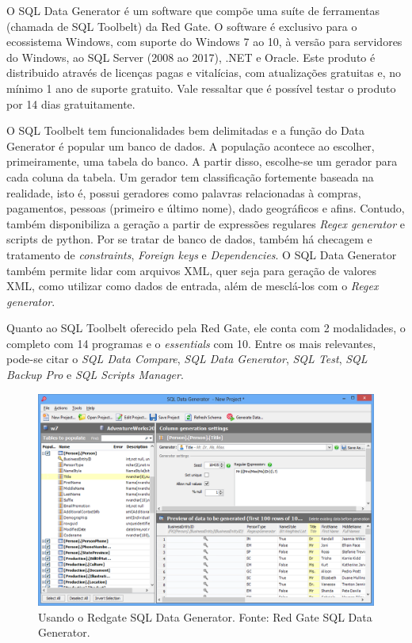 \documentclass[
	12pt,				%
	openright,			%
	twoside,			%
	a4paper,			%
	english,			%
	brazil				%
	]{abntex2}
\begin{document}
		O SQL Data Generator \cite{RedgateSQLDataGenerator} é um software que compõe uma suíte de ferramentas (chamada de SQL Toolbelt) da Red Gate.
		O software é exclusivo para o ecossistema Windows, com suporte do Windows 7 ao 10, à versão para servidores do Windows, ao SQL Server (2008 ao 2017), .NET e Oracle.
		Este produto é distribuido através de licenças pagas e vitalícias, com atualizações gratuitas e, no mínimo 1 ano de suporte gratuito.
		Vale ressaltar que é possível testar o produto por 14 dias gratuitamente.
		\par
		O SQL Toolbelt tem funcionalidades bem delimitadas e a função do Data Generator é popular um banco de dados. 
		A população acontece ao escolher, primeiramente, uma tabela do banco.
		A partir disso, escolhe-se um gerador para cada coluna da tabela.
		Um gerador tem classificação fortemente baseada na realidade, isto é, possui geradores como palavras relacionadas à compras, pagamentos, pessoas (primeiro e último nome), dado geográficos e afins.
		Contudo, também disponibiliza a geração a partir de expressões regulares \emph{Regex generator} e scripts de python.
		Por se tratar de banco de dados, também há checagem e tratamento de \emph{constraints}, \emph{Foreign keys} e \emph{Dependencies}.
		O SQL Data Generator também permite lidar com arquivos XML, quer seja para geração de valores XML, como utilizar como dados de entrada, além de mesclá-los com o \emph{Regex generator}.
		\par
		Quanto ao SQL Toolbelt oferecido pela Red Gate, ele conta com 2 modalidades, o completo com 14 programas e o \emph{essentials} com 10.
		Entre os mais relevantes, pode-se citar o \emph{SQL Data Compare}, \emph{SQL Data Generator}, \emph{SQL Test}, \emph{SQL Backup Pro} e \emph{SQL Scripts Manager}.
		\begin{figure}[h]
			\centering
			\includegraphics[width=\linewidth]{./figures/TrabalhosRelacionados/sql-data-generator.png}
			\caption{Usando o Redgate SQL Data Generator. Fonte: Red Gate SQL Data Generator.}
			\label{fig:RedgateSQLDG}
		\end{figure}
\end{document}
